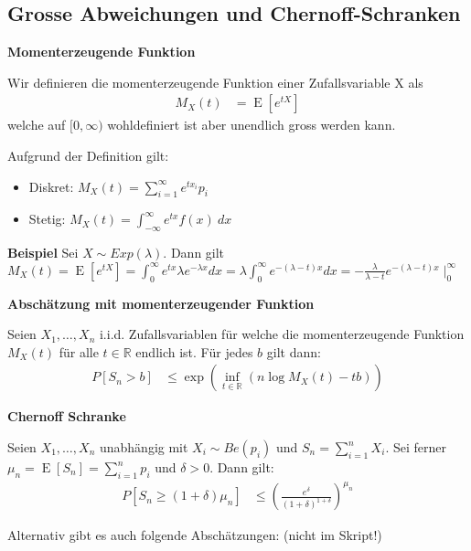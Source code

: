 \documentclass[25pt]{sciposter}
\newcommand{\R}{\mathbb{R}}
\newcommand{\E}{\operatorname{E}}
\newenvironment{method}[1]{\begin{mdframed}[backgroundcolor=blue!10,innertopmargin=15pt, innerbottommargin=15pt,nobreak=true]
		\textbf{#1 }
	}
	{ 
	\end{mdframed}
}
\begin{document}
\begin{multicols}{3}
		
		\subsection*{Grosse Abweichungen und Chernoff-Schranken}
		
		
		\begin{method}{Momenterzeugende Funktion}
			Wir definieren die momenterzeugende Funktion einer Zufallsvariable X als
			\begin{align*}
				M_X(t) &= \E\left[e^{tX}\right]
			\end{align*}
			welche auf $[0,\infty)$ wohldefiniert ist aber unendlich gross werden kann.
			
			Aufgrund der Definition gilt:\begin{itemize}
				\item Diskret: $M_X(t) = \sum_{i=1}^{\infty} e^{tx_i}p_i$
				\item Stetig: $M_X(t)= \int_{-\infty}^{\infty} e^{tx}f(x)\ dx$
			\end{itemize}
		\end{method}
		
		\textbf{Beispiel}
		Sei $X \sim Exp(\lambda)$. Dann gilt $M_X(t) = \E[e^{tX}] = \int_{0}^{\infty} e^{tx} \lambda e^{-\lambda x} dx = \lambda \int_{0}^{\infty}e^{-(\lambda-t)x} dx = - \frac{\lambda}{\lambda - t} e^{-(\lambda -t)x}\mid_0^\infty$
		\begin{method}{Abschätzung mit momenterzeugender Funktion}
			Seien $X_1,\ldots,X_n$ i.i.d. Zufallsvariablen für welche die momenterzeugende Funktion $M_X(t)$ für alle $t\in \R$ endlich ist. Für jedes $b$ gilt dann:
			\begin{align*}
				P[S_n > b] &\leq \exp \left( \inf_{t\in\R} \left(  n\log M_X(t) - tb \right)  \right)
			\end{align*}
		\end{method}
		
		
		\begin{method}{Chernoff Schranke}
			Seien $X_1,\ldots,X_n$ unabhängig mit $X_i \sim Be(p_i)$ und $S_n = \sum_{i=1}^{n}X_i$. Sei ferner $\mu_n = \E[S_n] = \sum_{i=1}^{n} p_i$ und $\delta > 0$. Dann gilt:
			\begin{align*}
				P[S_n \geq (1+\delta)\mu_n] &\leq \left(\frac{e^\delta}{(1+\delta)^{1+\delta}}\right)^{\mu_n}
			\end{align*}
		\end{method}
		
		Alternativ gibt es auch folgende Abschätzungen: (nicht im Skript!)
		

\end{multicols}
\end{document}

